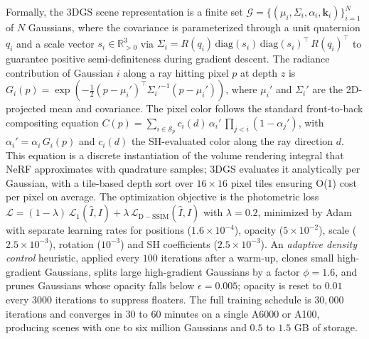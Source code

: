 Formally, the 3DGS scene representation is a finite set \(\mathcal{G}=\{(\mu_i,\Sigma_i,\alpha_i,\mathbf{k}_i)\}_{i=1}^N\) of \(N\) Gaussians, where the covariance is parameterized through a unit quaternion \(q_i\) and a scale vector \(s_i\in\mathbb{R}^3_{>0}\) via \(\Sigma_i = R(q_i)\,\mathrm{diag}(s_i)\,\mathrm{diag}(s_i)^{\top}\,R(q_i)^{\top}\) to guarantee positive semi-definiteness during gradient descent. The radiance contribution of Gaussian \(i\) along a ray hitting pixel \(p\) at depth \(z\) is \(G_i(p) = \exp(-\tfrac{1}{2}(p-\mu_i')^{\top}{\Sigma_i'}^{-1}(p-\mu_i'))\), where \(\mu_i'\) and \(\Sigma_i'\) are the 2D-projected mean and covariance. The pixel color follows the standard front-to-back compositing equation \(C(p) = \sum_{i\in\mathcal{S}_p} c_i(d)\,\alpha_i'\,\prod_{j<i}(1-\alpha_j')\), with \(\alpha_i'=\alpha_i\,G_i(p)\) and \(c_i(d)\) the SH-evaluated color along the ray direction \(d\). This equation is a discrete instantiation of the volume rendering integral that NeRF approximates with quadrature samples; 3DGS evaluates it analytically per Gaussian, with a tile-based depth sort over \(16\times16\) pixel tiles ensuring O(1) cost per pixel on average. The optimization objective is the photometric loss \(\mathcal{L} = (1-\lambda)\,\mathcal{L}_1(\hat{I},I) + \lambda\,\mathcal{L}_{\mathrm{D-SSIM}}(\hat{I},I)\) with \(\lambda=0.2\), minimized by Adam with separate learning rates for positions (\(1.6\times10^{-4}\)), opacity (\(5\times10^{-2}\)), scale (\(2.5\times10^{-3}\)), rotation (\(10^{-3}\)) and SH coefficients (\(2.5\times10^{-3}\)). An \emph{adaptive density control} heuristic, applied every \(100\) iterations after a warm-up, clones small high-gradient Gaussians, splits large high-gradient Gaussians by a factor \(\phi=1.6\), and prunes Gaussians whose opacity falls below \(\epsilon=0.005\); opacity is reset to \(0.01\) every \(3000\) iterations to suppress floaters. The full training schedule is \(30{,}000\) iterations and converges in \(30\) to \(60\) minutes on a single A6000 or A100, producing scenes with one to six million Gaussians and \(0.5\) to \(1.5\) GB of storage.

